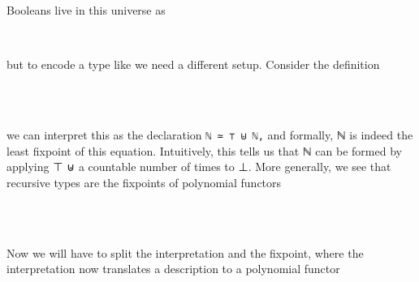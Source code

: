 Booleans live in this universe as
\begin{code}%
%
\>[2]\AgdaSpace{}%
\AgdaSymbol{:}\AgdaSpace{}%
\<%
\\
%
\>[2]\AgdaSpace{}%
\AgdaSymbol{=}\AgdaSpace{}%
\AgdaSpace{}%
\AgdaSpace{}%
\<%
\end{code}
but to encode a type like \bN we need a different setup. Consider the definition
\begin{code}%
\>[0]\AgdaSpace{}%
\AgdaSpace{}%
\AgdaSymbol{:}\AgdaSpace{}%
\AgdaSpace{}%
\<%
\\
\>[0][@{}l@{\AgdaIndent{0}}]%
\>[2]%
\>[8]\AgdaSymbol{:}\AgdaSpace{}%
\<%
\\
%
\>[2]%
\>[8]\AgdaSymbol{:}\AgdaSpace{}%
\AgdaSpace{}%
\AgdaSpace{}%
\<%
\end{code}
we can interpret this as the declaration \texttt{ℕ ≃ ⊤ ⊎ ℕ,} and formally, ℕ is indeed the least fixpoint of this equation. Intuitively, this tells us that ℕ can be formed by applying ⊤ ⊎ a countable number of times to ⊥. More generally, we see that recursive types are the fixpoints of polynomial functors
\begin{code}[hide]%
\>[0]\AgdaSpace{}%
\AgdaSpace{}%
\<%
\end{code}
\begin{code}%
\>[0][@{}l@{\AgdaIndent{1}}]%
\>[2]\AgdaSpace{}%
\AgdaSpace{}%
\AgdaSymbol{:}\AgdaSpace{}%
\AgdaSpace{}%
\<%
\\
\>[2][@{}l@{\AgdaIndent{0}}]%
\>[4]\AgdaSpace{}%
%
\>[13]\AgdaSymbol{:}\AgdaSpace{}%
\<%
\\
%
\>[4]\AgdaSpace{}%
%
\>[13]\AgdaSymbol{:}\AgdaSpace{}%
\AgdaSpace{}%
\AgdaSpace{}%
\AgdaSpace{}%
\AgdaSpace{}%
\<%
\end{code}
Now we will have to split the interpretation and the fixpoint, where the interpretation now translates a description to a polynomial functor
